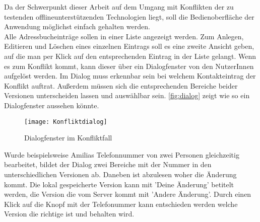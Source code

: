 Da der Schwerpunkt dieser Arbeit auf dem Umgang mit Konflikten der zu testenden offlineunterstützenden Technologien liegt, soll die Bedienoberfläche der Anwendung möglichst einfach gehalten werden.\\
Alle Adressbucheinträge sollen in einer Liste angezeigt werden. Zum Anlegen, Editieren und Löschen eines einzelnen Eintrags soll es eine zweite Ansicht geben, auf die man per Klick auf den entsprechenden Eintrag in der Liste gelangt.
Wenn es zum Konflikt kommt, kann dieser über ein Dialogfenster von den NutzerInnen aufgelöst werden. Im Dialog muss erkennbar sein bei welchem Kontakteintrag der Konflikt auftrat.
Außerdem müssen sich die entsprechenden Bereiche beider Versionen unterscheiden lassen und auswählbar sein. \autoref{fig:dialog} zeigt wie so ein Dialogfenster aussehen könnte.
\begin{figure}[H]
	\centering
	\texttt{[image: Konfliktdialog]}
	\grayRule
	\caption{Dialogfenster im Konfliktfall}
	\label{fig:dialog}
\end{figure}
Wurde beispielsweise Amilias Telefonnummer von zwei Personen gleichzeitig bearbeitet, bildet der Dialog zwei Bereiche mit der Nummer in den unterschiedlichen Versionen ab.
Daneben ist abzulesen woher die Änderung kommt. Die lokal gespeicherte Version kann mit 'Deine Änderung' betitelt werden, die Version die vom Server kommt mit 'Andere Änderung'.
Durch einen Klick auf die Knopf mit der Telefonummer kann entschieden werden welche Version die richtige ist und behalten wird.
